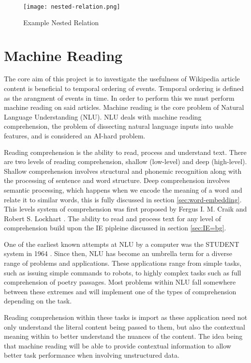 \documentclass[bsc,frontabs,twoside,singlespacing,parskip,deptreport]{infthesis}     %
\begin{document}
\begin{figure}[H]
  \centering
  \texttt{[image: nested-relation.png]}
  \caption{Example Nested Relation}
  \label{fig:nested-relation}
\end{figure}


\section{Machine Reading}
The core aim of this project is to investigate the usefulness of Wikipedia article content is beneficial to temporal ordering of events.
Temporal ordering is defined as the arangment of events in time.
In order to perform this we must perform machine reading on said articles.
Machine reading is the core problem of Natural Language Understanding (NLU).
NLU deals with machine reading comprehension, the problem of dissecting natural language inputs into usable features,
and is considered an AI-hard problem.

Reading comprehension is the ability to read, process and understand text.  
There are two levels of reading comprehension, shallow (low-level) and deep (high-level).
Shallow comprehension involves structural and phonemic recognition along with the processing of sentence and  word
structure.
Deep comprehension involves semantic processing, which happens when we encode the meaning of a word and relate it
to similar words, this is fully discussed in section \ref{sec:word-embedding}.
This levels system of comprehension was first proposed by  Fergus I. M. Craik and Robert S. Lockhart \cite{wagner2009beyond}.
The ability to read and process text for any level of comprehension build upon the IE pipleine discussed in section \ref{sec:IE=bg}.

One of the earliest known attempts at NLU by a computer was the STUDENT system in 1964 \cite{russell1995modern}.
Since then, NLU has become an
umbrella term for a diverse range of problems and applications. These applications range from simple tasks, such as
issuing simple commands to robots, to highly complex tasks such as full comprehension of poetry passages.
Most problems within NLU fall somewhere between these extremes and will implement one of the types of comprehension
depending on the task.

Reading comprehension within these tasks is import as these application need not only understand the literal content
being passed to them, but also the contextual meaning within to better understand the nuances of the content.
The idea being that machine reading will be able to provide contextual information to allow better task performance when
involving unstructured data.
\end{document}
